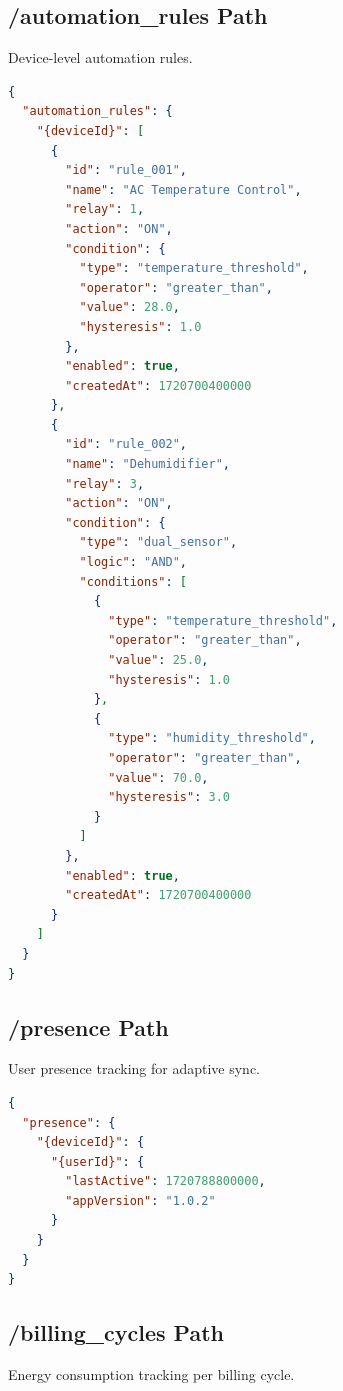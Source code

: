 \subsection{/automation\_rules Path}

Device-level automation rules.

\begin{lstlisting}[language=json, caption=Automation Rules Structure, label=lst:automation_rules]
{
  "automation_rules": {
    "{deviceId}": [
      {
        "id": "rule_001",
        "name": "AC Temperature Control",
        "relay": 1,
        "action": "ON",
        "condition": {
          "type": "temperature_threshold",
          "operator": "greater_than",
          "value": 28.0,
          "hysteresis": 1.0
        },
        "enabled": true,
        "createdAt": 1720700400000
      },
      {
        "id": "rule_002",
        "name": "Dehumidifier",
        "relay": 3,
        "action": "ON",
        "condition": {
          "type": "dual_sensor",
          "logic": "AND",
          "conditions": [
            {
              "type": "temperature_threshold",
              "operator": "greater_than",
              "value": 25.0,
              "hysteresis": 1.0
            },
            {
              "type": "humidity_threshold",
              "operator": "greater_than",
              "value": 70.0,
              "hysteresis": 3.0
            }
          ]
        },
        "enabled": true,
        "createdAt": 1720700400000
      }
    ]
  }
}
\end{lstlisting}

\subsection{/presence Path}

User presence tracking for adaptive sync.

\begin{lstlisting}[language=json, caption=Presence Structure, label=lst:presence_path]
{
  "presence": {
    "{deviceId}": {
      "{userId}": {
        "lastActive": 1720788800000,
        "appVersion": "1.0.2"
      }
    }
  }
}
\end{lstlisting}

\subsection{/billing\_cycles Path}

Energy consumption tracking per billing cycle.

